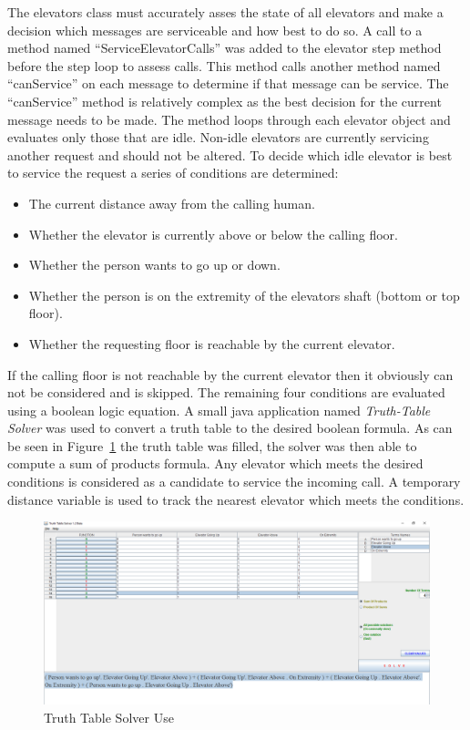 \documentclass{article}
\begin{document}
The elevators class must accurately asses the state of all elevators and make a decision which messages are serviceable and how best to do so.
A call to a method named ``ServiceElevatorCalls'' was added to the elevator step method before the step loop to assess calls.
This method calls another method named ``canService'' on each message to determine if that message can be service.
The ``canService'' method is relatively complex as the best decision for the current message needs to be made.
The method loops through each elevator object and evaluates only those that are idle.
Non-idle elevators are currently servicing another request and should not be altered.
To decide which idle elevator is best to service the request a series of conditions are determined:
\begin{itemize}
	\item The current distance away from the calling human.
	\item Whether the elevator is currently above or below the calling floor.
	\item Whether the person wants to go up or down.
	\item Whether the person is on the extremity of the elevators shaft (bottom or top floor).
	\item Whether the requesting floor is reachable by the current elevator.
\end{itemize} 
If the calling floor is not reachable by the current elevator then it obviously can not be considered and is skipped.
The remaining four conditions are evaluated using a boolean logic equation.
A small java application named \textit{Truth-Table Solver} was used to convert a truth table to the desired boolean formula.
As can be seen in Figure~\ref{fig:untitled} the truth table was filled, the solver was then able to compute a sum of products formula.
Any elevator which meets the desired conditions is considered as a candidate to service the incoming call.
A temporary distance variable is used to track the nearest elevator which meets the conditions.\newline
\begin{figure}
	\centering
	\includegraphics[width=1\linewidth]{Untitled}
	\caption[Truth Table Solver Use]{Truth Table Solver Use}
	\label{fig:untitled}
\end{figure}
\end{document}
